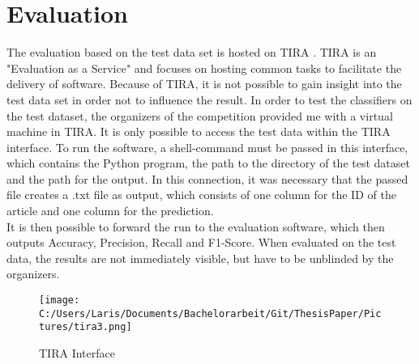 \documentclass[a4paper, 11pt,titlepage,oneside,openany]{book}
\begin{document}
\chapter{Evaluation}
The evaluation based on the test data set is hosted on TIRA \cite{tira}. TIRA is an "Evaluation as a Service" \cite{evaluationasaservice} and focuses on hosting common tasks to facilitate the delivery of software. Because of TIRA, it is not possible to gain insight into the test data set in order not to influence the result.
In order to test the classifiers on the test dataset, the organizers of the competition provided me with a virtual machine in TIRA. It is only possible to access the test data within the TIRA interface. To run the software, a shell-command must be passed in this interface, which contains the Python program, the path to the directory of the test dataset and the path for the output. In this connection, it was necessary that the passed file creates a .txt file as output, which consists of one column for the ID of the article and one column for the prediction. \\
\indent It is then possible to forward the run to the evaluation software, which then outputs Accuracy, Precision, Recall and F1-Score. When evaluated on the test data, the results are not immediately visible, but have to be unblinded by the organizers. 
\begin{figure}[h]
	\centering
	\texttt{[image: C:/Users/Laris/Documents/Bachelorarbeit/Git/ThesisPaper/Pictures/tira3.png]}
	\caption{TIRA Interface}
\end{figure}
\end{document}
